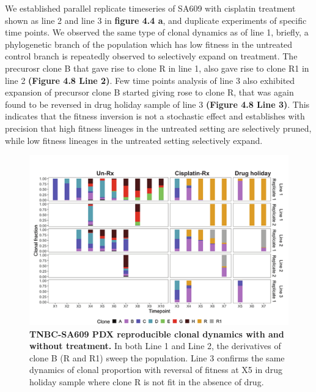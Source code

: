 We established parallel replicate timeseries of SA609 with cisplatin treatment shown as line 2 and line 3 in \textbf{figure 4.4 a}, and duplicate experiments of specific time points. We observed the same type of clonal dynamics as of line 1, briefly, a phylogenetic branch of the population which has low fitness in the untreated control branch is repeatedly observed to selectively expand on treatment. The precurosr clone B that gave rise to clone R in line 1, also gave rise to clone R1 in line 2 \textbf{(Figure 4.8 Line 2)}. Few time points analysis of line 3 also exhibited expansion of precursor clone B started giving rose to clone R, that was again found to be reversed in drug holiday sample of line 3 \textbf{(Figure 4.8 Line 3)}. This indicates that the fitness inversion is not a stochastic effect and establishes with precision that high fitness lineages in the untreated setting are selectively pruned, while low fitness lineages in the untreated setting selectively expand.

\begin{figure}
\centering
\includegraphics[width=\textwidth]{Figures/SA609barplotanalysis.pdf}
	
\caption[TNBC-SA609 PDX reproducible clonal dynamics with and without treatment]
	{\small
	\textbf{TNBC-SA609 PDX reproducible clonal dynamics with and without treatment.}
	    In both Line 1 and Line 2, the derivatives of clone B (R and R1) sweep the population. Line 3 confirms the same dynamics of clonal proportion with reversal of fitness at X5 in drug holiday sample where clone R is not fit in the absence of drug.
	}
	\label{fig:Untreated timeseries growth curves only}
\end{figure}

